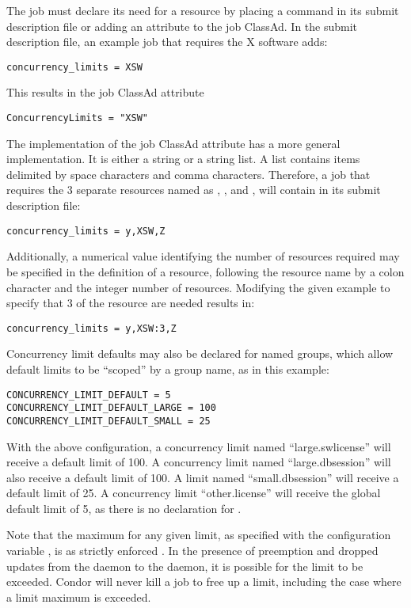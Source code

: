 The job must declare its need for a resource by placing a command
in its submit description file or adding an attribute to the
job ClassAd.
In the submit description file, an example job that requires
the X software adds:
\begin{verbatim}
concurrency_limits = XSW
\end{verbatim}
This results in the job ClassAd attribute
\begin{verbatim}
ConcurrencyLimits = "XSW"
\end{verbatim}

The implementation of the job ClassAd attribute 
has a more general implementation.
It is either a string or a string list.
A list contains items delimited by space characters and comma characters.
Therefore, a job that requires the 3 separate resources 
named as  , , and  , 
will contain in its submit description file:
\begin{verbatim}
concurrency_limits = y,XSW,Z
\end{verbatim}

Additionally, a numerical value identifying the number of resources
required may be specified in the definition of a resource,
following the resource name by a colon character and the integer
number of resources.
Modifying the given example to specify that 3 of 
the  resource are needed results in: 
\begin{verbatim}
concurrency_limits = y,XSW:3,Z
\end{verbatim}

Concurrency limit defaults may also be declared for named groups, which
allow default limits to be ``scoped'' by a group name, as in this example:
\begin{verbatim}
CONCURRENCY_LIMIT_DEFAULT = 5
CONCURRENCY_LIMIT_DEFAULT_LARGE = 100
CONCURRENCY_LIMIT_DEFAULT_SMALL = 25
\end{verbatim}

With the above configuration, a concurrency limit named ``large.swlicense'' 
will receive a default limit of 100.  A concurrency limit named
``large.dbsession'' will also receive a default limit of 100.  A limit named
``small.dbsession'' will receive a default limit of 25.  A concurrency limit 
``other.license'' will receive the global default limit of 5, as there is
no declaration for .

Note that the maximum for any given limit,
as specified with the configuration variable ,
is as strictly enforced .
In the presence of preemption and dropped updates from
the  daemon to the  daemon,
it is possible for the limit to be exceeded.
Condor will never kill a job to free up a limit,
including the case where a limit maximum is exceeded. 
